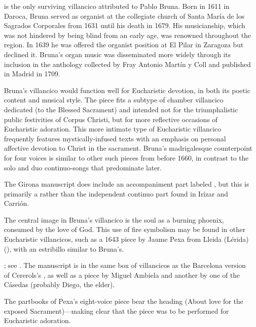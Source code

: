  is the only surviving villancico attributed to Pablo
Bruna.
Born in 1611 in Daroca, Bruna served as organist at the collegiate church of
Santa María de los Sagrados Corporales from 1631 until his death in 1679.%
    \Autocite[104]{Calahorra:Aragon}
His musicianship, which was not hindered by being blind from an early age, was
renowned throughout the region.
In 1639 he was offered the organist position at El Pilar in Zaragoza but
declined it.%
    \Autocite[123--125]{Calahorra:Aragon}
Bruna's organ music was disseminated more widely through its inclusion in the
anthology  collected by Fray
Antonio Martín y Coll and published in Madrid in 1709.


Bruna's villancico would function well for Eucharistic devotion, in both its
poetic content and musical style.  
The piece fits a subtype of chamber villancico dedicated  (to the Blessed Sacrament) and intended not for the triumphalistic 
public festivities of Corpus Christi, but for more reflective occasions of
Eucharistic adoration.
This more intimate type of Eucharistic villancico frequently features
mystically-infused texts with an emphasis on personal affective devotion to
Christ in the sacrament.  
Bruna's madrigalesque counterpoint for four voices is similar to other such
pieces from before 1660, in contrast to the solo and duo continuo-songs that
predominate later.%
\begin{Footnote}
    The Girona manuscript does include an accompaniment part labeled
    , but this is primarily a  rather
    than the independent continuo part found in Irízar and Carrión.
\end{Footnote}


The central image in Bruna's villancico is the soul as a burning phoenix,
consumed by the love of God.
This use of fire symbolism may be found in other Eucharistic villancicos, such
as a 1643 piece by Jaume Pexa from Lleida (Lérida)
(), with an estribillo similar to Bruna's.%
\begin{Footnote}
    ; see .
    The manuscript is in the same box of villancicos as the Barcelona version
    of Cererols's , as well as a piece by Miguel
    Ambiela and another by one of the Cásedas (probably Diego, the elder).  
\end{Footnote}
The partbooks of Pexa's eight-voice piece bear the heading  (About love for the exposed Sacrament)---making clear that
the piece was to be performed for Eucharistic adoration.  

